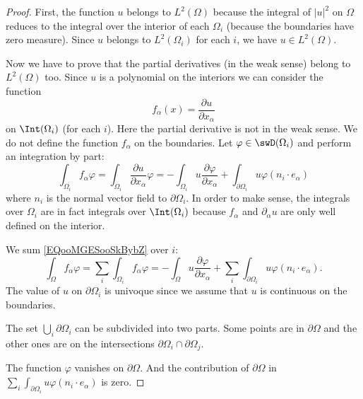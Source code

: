 \begin{proof}
    First, the function \( u\) belongs to \( L^2(\Omega)\) because the integral of \( | u |^2\) on \( \Omega\) reduces to the integral over the interior of each \( \Omega_i\) (because the boundaries have zero measure). Since \( u\) belongs to \( L^2(\Omega_i)\) for each \( i\), we have \( u\in L^2(\Omega)\).

    Now we have to prove that the partial derivatives (in the weak sense) belong to \( L^2(\Omega)\) too. Since \( u\) is a polynomial on the interiors we can consider the function
    \begin{equation}
        f_{\alpha}(x)=\frac{ \partial u }{ \partial x_{\alpha} }
    \end{equation}
    on \( \Int(\Omega_i)\) (for each \( i\)). Here the partial derivative is not in the weak sense. We do not define the function \( f_{\alpha}\) on the boundaries. Let \( \varphi\in \swD(\Omega_i)\) and perform an integration by part:
    \begin{equation}        \label{EQooMGESooSkBybZ}
        \int_{\Omega_i}f_{\alpha}\varphi=\int_{\Omega_i}\frac{ \partial u }{ \partial x_{\alpha} }\varphi=-\int_{\Omega_i}u\frac{ \partial \varphi }{ \partial x_{\alpha} }+\int_{\partial\Omega_i}u\varphi(n_i\cdot e_{\alpha})
    \end{equation}
    where \( n_i\) is the normal vector field to \( \partial\Omega_i\). In order to make sense, the integrals over \( \Omega_i\) are in fact integrals over \( \Int(\Omega_i)\) because \( f_{\alpha}\) and \( \partial_{\alpha}u\) are only well defined on the interior.

    We sum \eqref{EQooMGESooSkBybZ} over \( i\):
    \begin{equation}        \label{EQooKACAooGlBMaQ}
        \int_{\Omega}f_{\alpha}\varphi=\sum_i\int_{\Omega_i}f_{\alpha}\varphi=-\int_{\Omega}u\frac{ \partial \varphi }{ \partial x_{\alpha} }+\sum_i\int_{\partial\Omega_i}u\varphi(n_i\cdot e_{\alpha}).
    \end{equation}
    The value of \( u\) on \( \partial \Omega_i\) is univoque since we assume that \( u\) is continuous on the boundaries.

    The set \( \bigcup_i\partial\Omega_i\) can be subdivided into two parts. Some points are in \( \partial \Omega\) and the other ones are on the intersections \( \partial\Omega_i\cap \partial\Omega_j\).

    The function \( \varphi\) vanishes on \( \partial\Omega\). And the contribution of \( \partial\Omega\) in \( \sum_i\int_{\partial\Omega_i}u\varphi (n_i\cdot e_{\alpha})\) is zero.


\end{proof}
